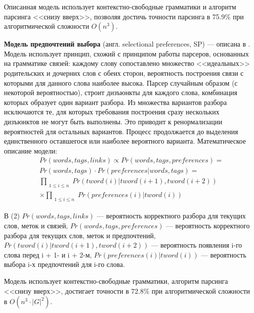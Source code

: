 Описанная модель использует контекстно-свободные грамматики и алгоритм парсинга <<снизу вверх>>, позволяя достичь точности парсинга в 75.9\% при алгоритмической сложности \(O(n^3)\).

\textbf{Модель предпочтений выбора} (англ. selectional preferences, SP) --- описана в \cite{eisner}. Модель использует принцип, схожий с принципом работы парсеров, основанных на грамматике связей: каждому слову сопоставлено множество <<идеальных>> родительских и дочерних слов с обеих сторон, вероятность построения связи с которыми для данного слова наиболее высока. Парсер случайным образом (с некоторой вероятностью), строит дизъюнкты для каждого слова, комбинация которых образует один вариант разбора. Из множества вариантов разбора исключаются те, для которых требования построения сразу нескольких дизъюнктов не могут быть выполнены. Это приводит к ренормализации вероятностей для остальных вариантов. Процесс продолжается до выделения единственного оставшегося или наиболее вероятного варианта. Математическое описание модели:
\begin{equation}\begin{split}
	& Pr(words, tags, links) \propto Pr(words, tags, preferences) = \\
	& Pr(words, tags) \cdot Pr(preferences | words, tags) = \\
	& \prod_{\substack{1 \leq i \leq n}} Pr(tword(i) | tword(i + 1), tword(i + 2)) \\
	& \times \prod_{\substack{1 \leq i \leq n}} Pr(preferences(i) | tword(i))
\end{split}\end{equation}

В (2) \(Pr(words, tags, links)\) --- вероятность корректного разбора для текущих слов, меток и связей, \(Pr(words, tags, preferences)\) --- вероятность корректного разбора для текущих слов, меток и предпочтений,\\ \(Pr(tword(i) | tword(i + 1), tword(i + 2))\) --- вероятность появления i-го слова перед i + 1- и i + 2-м, \(Pr(preferences(i) | tword(i))\) --- вероятность выбора i-х предпочтений для i-го слова.

Модель использует контекстно-свободные грамматики, алгоритм парсинга <<снизу вверх>>, достигает точности в 72.8\% при алгоритмической сложности в \(O(n^3 \cdot |G|^2)\).

